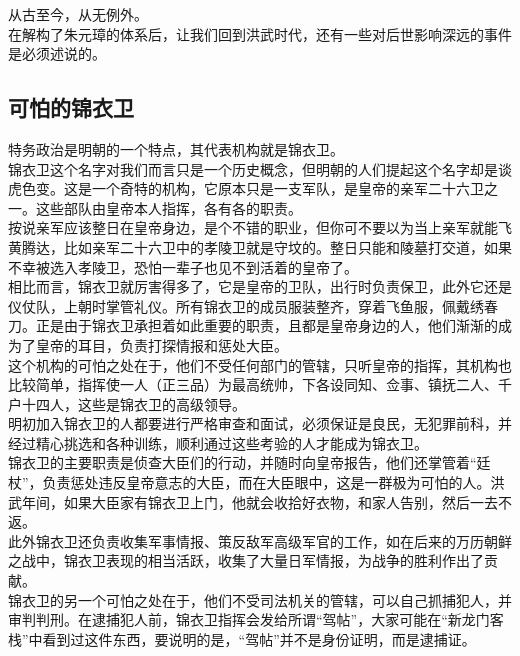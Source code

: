 \begin{multicols}{\theparacolNo}
从古至今，从无例外。\\

在解构了朱元璋的体系后，让我们回到洪武时代，还有一些对后世影响深远的事件是必须述说的。\\

\subsection{可怕的锦衣卫}
特务政治是明朝的一个特点，其代表机构就是锦衣卫。\\

锦衣卫这个名字对我们而言只是一个历史概念，但明朝的人们提起这个名字却是谈虎色变。这是一个奇特的机构，它原本只是一支军队，是皇帝的亲军二十六卫之一。这些部队由皇帝本人指挥，各有各的职责。\\

按说亲军应该整日在皇帝身边，是个不错的职业，但你可不要以为当上亲军就能飞黄腾达，比如亲军二十六卫中的孝陵卫就是守坟的。整日只能和陵墓打交道，如果不幸被选入孝陵卫，恐怕一辈子也见不到活着的皇帝了。\\

相比而言，锦衣卫就厉害得多了，它是皇帝的卫队，出行时负责保卫，此外它还是仪仗队，上朝时掌管礼仪。所有锦衣卫的成员服装整齐，穿着飞鱼服，佩戴绣春刀。正是由于锦衣卫承担着如此重要的职责，且都是皇帝身边的人，他们渐渐的成为了皇帝的耳目，负责打探情报和惩处大臣。\\

这个机构的可怕之处在于，他们不受任何部门的管辖，只听皇帝的指挥，其机构也比较简单，指挥使一人（正三品）为最高统帅，下各设同知、佥事、镇抚二人、千户十四人，这些是锦衣卫的高级领导。\\

明初加入锦衣卫的人都要进行严格审查和面试，必须保证是良民，无犯罪前科，并经过精心挑选和各种训练，顺利通过这些考验的人才能成为锦衣卫。\\

锦衣卫的主要职责是侦查大臣们的行动，并随时向皇帝报告，他们还掌管着“廷杖”，负责惩处违反皇帝意志的大臣，而在大臣眼中，这是一群极为可怕的人。洪武年间，如果大臣家有锦衣卫上门，他就会收拾好衣物，和家人告别，然后一去不返。\\

此外锦衣卫还负责收集军事情报、策反敌军高级军官的工作，如在后来的万历朝鲜之战中，锦衣卫表现的相当活跃，收集了大量日军情报，为战争的胜利作出了贡献。\\

锦衣卫的另一个可怕之处在于，他们不受司法机关的管辖，可以自己抓捕犯人，并审判判刑。在逮捕犯人前，锦衣卫指挥会发给所谓“驾帖”，大家可能在“新龙门客栈”中看到过这件东西，要说明的是，“驾帖”并不是身份证明，而是逮捕证。\\


\end{multicols}
